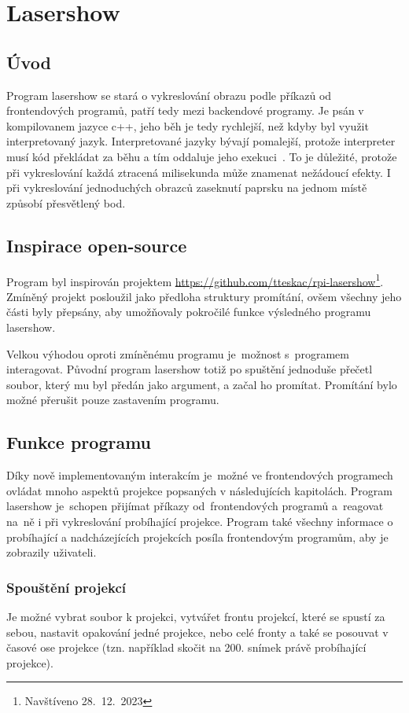 \section{Lasershow}
\subsection{Úvod}

Program lasershow se stará o vykreslování obrazu podle příkazů od frontendových programů, patří tedy mezi backendové programy.
Je psán v kompilovanem jazyce c++, jeho běh je tedy rychlejší, než kdyby byl využit interpretovaný jazyk.
Interpretované jazyky bývají pomalejší, protože interpreter musí kód překládat za běhu a tím oddaluje jeho exekuci~\cite{interpret}. To je důležité, protože při vykreslování každá ztracená milisekunda může znamenat nežádoucí efekty. I při vykreslování jednoduchých obrazců zaseknutí paprsku na jednom místě způsobí přesvětlený bod.

\subsection{Inspirace open-source}
Program byl inspirován projektem \url{https://github.com/tteskac/rpi-lasershow}\footnote{Navštíveno 28.~12.~2023}. Zmíněný projekt posloužil jako předloha struktury promítání, ovšem všechny jeho části byly přepsány, aby umožňovaly pokročilé funkce výsledného programu lasershow.

Velkou výhodou oproti zmíněnému programu je~možnost s~programem interagovat.
Původní program lasershow totiž po spuštění jednoduše přečetl soubor, který mu byl předán jako argument, a začal ho promítat. Promítání bylo možné přerušit pouze zastavením programu.

\subsection{Funkce programu}
Díky nově implementovaným interakcím je~možné ve frontendových programech ovládat mnoho aspektů projekce popsaných v následujících kapitolách. Program lasershow je~schopen přijímat příkazy od~frontendových programů a~reagovat na~ně i při vykreslování probíhající projekce. Program také všechny informace o probíhající a nadcházejících projekcích posíla frontendovým programům, aby je zobrazily uživateli.

\subsubsection{Spouštění projekcí}
Je možné vybrat soubor k projekci, vytvářet frontu projekcí, které se spustí za sebou, nastavit opakování jedné projekce, nebo celé fronty a také se posouvat v časové ose projekce (tzn. například skočit na 200. snímek právě probíhající projekce).

